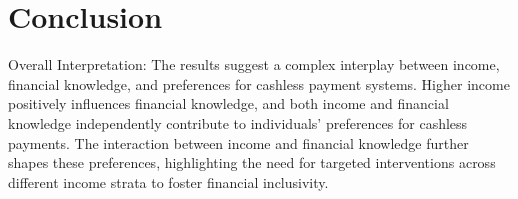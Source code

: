 \documentclass[
  super,
  preprint,
  3p]{elsarticle}
\begin{document}
\citep{jarvis2003}

\hypertarget{conclusion}{%
\section{Conclusion}\label{conclusion}}

Overall Interpretation: The results suggest a complex interplay between
income, financial knowledge, and preferences for cashless payment
systems. Higher income positively influences financial knowledge, and
both income and financial knowledge independently contribute to
individuals' preferences for cashless payments. The interaction between
income and financial knowledge further shapes these preferences,
highlighting the need for targeted interventions across different income
strata to foster financial inclusivity.


\renewcommand\refname{References}
  
\end{document}
